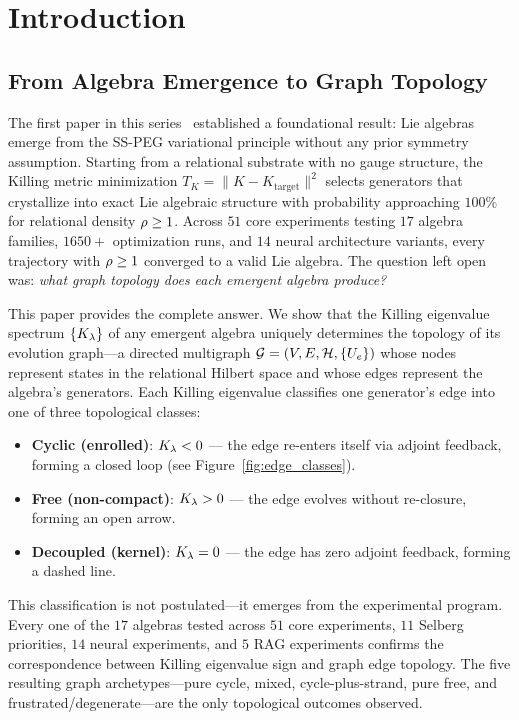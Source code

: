\section{Introduction}\label{sec:introduction}

\subsection{From Algebra Emergence to Graph Topology}\label{sec:from_p1_to_p2}

The first paper in this series~\cite{paper1_killing_algebra} established a foundational result: Lie algebras emerge from the SS-PEG variational principle without any prior symmetry assumption. Starting from a relational substrate with no gauge structure, the Killing metric minimization $T_K = \|K - K_{\mathrm{target}}\|^2$ selects generators that crystallize into exact Lie algebraic structure with probability approaching $100\%$ for relational density $\rho \geq 1$. Across $51$ core experiments testing $17$ algebra families, $1650+$ optimization runs, and $14$ neural architecture variants, every trajectory with $\rho \geq 1$ converged to a valid Lie algebra. The question left open was: \emph{what graph topology does each emergent algebra produce?}

This paper provides the complete answer. We show that the Killing eigenvalue spectrum $\{K_\lambda\}$ of any emergent algebra uniquely determines the topology of its evolution graph---a directed multigraph $\mathcal{G} = (V, E, \mathcal{H}, \{U_e\})$ whose nodes represent states in the relational Hilbert space and whose edges represent the algebra's generators. Each Killing eigenvalue classifies one generator's edge into one of three topological classes:

\begin{itemize}
    \item \textbf{Cyclic (enrolled)}: $K_\lambda < 0$ --- the edge re-enters itself via adjoint feedback, forming a closed loop (see Figure~\ref{fig:edge_classes}).
    \item \textbf{Free (non-compact)}: $K_\lambda > 0$ --- the edge evolves without re-closure, forming an open arrow.
    \item \textbf{Decoupled (kernel)}: $K_\lambda = 0$ --- the edge has zero adjoint feedback, forming a dashed line.
\end{itemize}

This classification is not postulated---it emerges from the experimental program. Every one of the $17$ algebras tested across $51$ core experiments, $11$ Selberg priorities, $14$ neural experiments, and $5$ RAG experiments confirms the correspondence between Killing eigenvalue sign and graph edge topology. The five resulting graph archetypes---pure cycle, mixed, cycle-plus-strand, pure free, and frustrated/degenerate---are the only topological outcomes observed.

